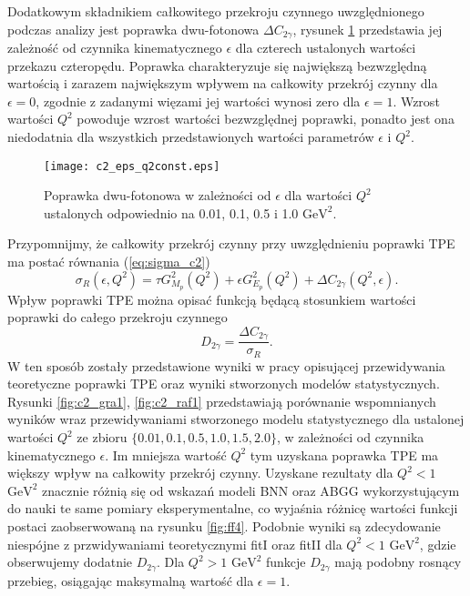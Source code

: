 \documentclass[11pt]{book}
\theoremstyle{definition}
\begin{document}

Dodatkowym składnikiem całkowitego przekroju czynnego uwzględnionego podczas analizy jest poprawka dwu-fotonowa $\Delta C_{2\gamma}$, rysunek \ref{fig:c2_eps} przedstawia jej zależność od czynnika kinematycznego $\epsilon$ dla czterech ustalonych wartości przekazu czteropędu. Poprawka charakteryzuje się największą bezwzględną wartością i zarazem największym wpływem na całkowity przekrój czynny dla $\epsilon = 0$, zgodnie z zadanymi więzami jej wartości wynosi zero dla $\epsilon = 1$. Wzrost wartości $Q^2$ powoduje wzrost wartości bezwzględnej poprawki, ponadto jest ona niedodatnia dla wszystkich przedstawionych wartości parametrów $\epsilon$ i $Q^2$.

\begin{figure}[h!]
	\centering
	\texttt{[image: c2\_eps\_q2const.eps]}
	\caption{Poprawka dwu-fotonowa w zależności od $\epsilon$ dla wartości $Q^2$ ustalonych odpowiednio na 0.01, 0.1, 0.5 i 1.0 $\text{GeV}^2$.} 
	\label{fig:c2_eps}
\end{figure}
%
Przypomnijmy, że całkowity przekrój czynny przy uwzględnieniu poprawki TPE ma postać równania (\ref{eq:sigma_c2})
%
$$
\sigma_R(\epsilon, Q^2) =\tau G_{M_p}^2(Q^2) + \epsilon G_{E_p}^2(Q^2) + \Delta C_{2 \gamma} \left(Q^2, \epsilon \right).
$$
%
Wpływ poprawki TPE można opisać funkcją będącą stosunkiem wartości poprawki do całego przekroju czynnego
\begin{equation}
	D_{2 \gamma} = \frac{\Delta C_{2 \gamma}}{\sigma_R}.
\end{equation}
%
W ten sposób zostały przedstawione wyniki w pracy \cite{2013PhRvC..88f5205G} opisującej przewidywania teoretyczne poprawki TPE oraz wyniki stworzonych modelów statystycznych. Rysunki \ref{fig:c2_gra1}, \ref{fig:c2_raf1} przedstawiają porównanie wspomnianych wyników wraz przewidywaniami stworzonego modelu statystycznego dla ustalonej wartości $Q^2$ ze zbioru $\{0.01, 0.1,0.5,1.0,1.5,2.0\}$, w zależności od czynnika kinematycznego $\epsilon$. Im mniejsza wartość $Q^2$ tym uzyskana poprawka TPE ma większy wpływ na całkowity przekrój czynny. Uzyskane rezultaty dla $Q^2 < 1$ $\text{GeV}^2$ znacznie różnią się od wskazań modeli BNN oraz ABGG wykorzystującym do nauki te same pomiary eksperymentalne, co wyjaśnia różnicę wartości funkcji postaci zaobserwowaną na rysunku \ref{fig:ff4}. Podobnie wyniki są zdecydowanie niespójne z przwidywaniami teoretycznymi fitI oraz fitII dla $Q^2 < 1$ $\text{GeV}^2$, gdzie obserwujemy dodatnie $D_{2 \gamma}$. Dla $Q^2 > 1$ $\text{GeV}^2$ funkcje $D_{2 \gamma}$ mają podobny rosnący przebieg, osiągając maksymalną wartość dla $\epsilon=1$. 
\end{document}
